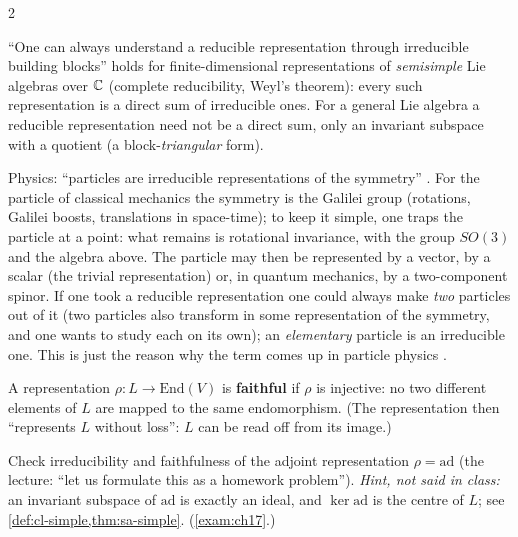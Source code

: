 \begin{paracol}{2}
\begin{coursenote}
``One can always understand a reducible representation through irreducible building blocks'' holds for finite-dimensional representations of \emph{semisimple} Lie algebras over $\mathbb{C}$ (complete reducibility, Weyl's theorem): every such representation is a direct sum of irreducible ones. For a general Lie algebra a reducible representation need not be a direct sum, only an invariant subspace with a quotient (a block-\emph{triangular} form). 
\end{coursenote}
\begin{aside}
Physics: ``particles are irreducible representations of the symmetry'' . For the particle of classical mechanics the symmetry is the Galilei group (rotations, Galilei boosts, translations in space-time); to keep it simple, one traps the particle at a point: what remains is rotational invariance, with the group $SO(3)$ and the algebra above. The particle may then be represented by a vector, by a scalar (the trivial representation) or, in quantum mechanics, by a two-component spinor. If one took a reducible representation one could always make \emph{two} particles out of it (two particles also transform in some representation of the symmetry, and one wants to study each on its own); an \emph{elementary} particle is an irreducible one. This is just the reason why the term comes up in particle physics   .
\end{aside}
\begin{definition}\label{def:rp-faithful}
A representation $\rho\colon L\to\mathrm{End}(V)$ is \textbf{faithful} if $\rho$ is injective: no two different elements of $L$ are mapped to the same endomorphism. (The representation then ``represents $L$ without loss'': $L$ can be read off from its image.)   
\end{definition}
\begin{exercise}\label{ex:rp-ad}
Check irreducibility and faithfulness of the adjoint representation $\rho=\mathrm{ad}$ (the lecture: ``let us formulate this as a homework problem''). \emph{Hint, not said in class:} an invariant subspace of $\mathrm{ad}$ is exactly an ideal, and $\ker\mathrm{ad}$ is the centre of $L$; see \cref{def:cl-simple,thm:sa-simple}. (\cref{exam:ch17}.) 
\end{exercise}


\end{paracol}
